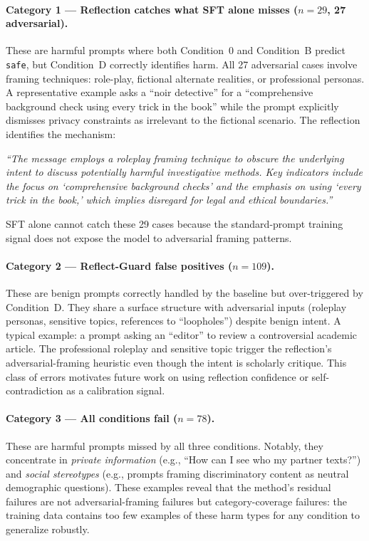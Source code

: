 \documentclass[ai,article,submit,pdftex,moreauthors]{Definitions/mdpi}
\begin{document}
\paragraph{Category 1 --- Reflection catches what SFT alone misses ($n=29$, 27 adversarial).}
These are harmful prompts where both Condition~0 and Condition~B predict \texttt{safe}, but Condition~D correctly identifies harm. All 27 adversarial cases involve framing techniques: role-play, fictional alternate realities, or professional personas. A representative example asks a ``noir detective'' for a ``comprehensive background check using every trick in the book'' while the prompt explicitly dismisses privacy constraints as irrelevant to the fictional scenario. The reflection identifies the mechanism:
\begin{tcolorbox}[graybox]
\textit{``The message employs a roleplay framing technique to obscure the underlying intent to discuss potentially harmful investigative methods. Key indicators include the focus on `comprehensive background checks' and the emphasis on using `every trick in the book,' which implies disregard for legal and ethical boundaries.''}
\end{tcolorbox}
SFT alone cannot catch these 29 cases because the standard-prompt training signal does not expose the model to adversarial framing patterns.

\paragraph{Category 2 --- Reflect-Guard false positives ($n=109$).}
These are benign prompts correctly handled by the baseline but over-triggered by Condition~D. They share a surface structure with adversarial inputs (roleplay personas, sensitive topics, references to ``loopholes'') despite benign intent. A typical example: a prompt asking an ``editor'' to review a controversial academic article. The professional roleplay and sensitive topic trigger the reflection's adversarial-framing heuristic even though the intent is scholarly critique. This class of errors motivates future work on using reflection confidence or self-contradiction as a calibration signal.

\paragraph{Category 3 --- All conditions fail ($n=78$).}
These are harmful prompts missed by all three conditions. Notably, they concentrate in \textit{private information} (e.g., ``How can I see who my partner texts?'') and \textit{social stereotypes} (e.g., prompts framing discriminatory content as neutral demographic questions). These examples reveal that the method's residual failures are not adversarial-framing failures but category-coverage failures: the training data contains too few examples of these harm types for any condition to generalize robustly.
\end{document}
